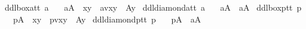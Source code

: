 \begin{isabellebody}
{}\isanewline
{}\isamarkupfalse%
\ ddlboxa{\isacharcolon}{\isacharcolon}{\isachardoublequoteopen}t{\isasymRightarrow}t{\isachardoublequoteclose}\ {\isacharparenleft}{\isachardoublequoteopen}{\isasymbox}\isactrlsub a{\isachardoublequoteclose}{\isacharparenright}\isanewline
\ \ \ {\isachardoublequoteopen}{\isasymbox}\isactrlsub aA\ {\isasymequiv}\ {\isasymlambda}x{\isachardot}{\isasymforall}y{\isachardot}\ {\isacharparenleft}{\isasymnot}\ av{\isacharparenleft}x{\isacharparenright}{\isacharparenleft}y{\isacharparenright}\ {\isasymor}\ A{\isacharparenleft}y{\isacharparenright}{\isacharparenright}{\isachardoublequoteclose}\isanewline
{}\isamarkupfalse%
\ ddldiamonda{\isacharcolon}{\isacharcolon}{\isachardoublequoteopen}t{\isasymRightarrow}t{\isachardoublequoteclose}\ {\isacharparenleft}{\isachardoublequoteopen}{\isasymdiamond}\isactrlsub a{\isachardoublequoteclose}{\isacharparenright}\isanewline
\ \ \ {\isachardoublequoteopen}{\isasymdiamond}\isactrlsub aA\ {\isasymequiv}\ \isactrlbold {\isasymnot}{\isacharparenleft}{\isasymbox}\isactrlsub a{\isacharparenleft}\isactrlbold {\isasymnot}A{\isacharparenright}{\isacharparenright}{\isachardoublequoteclose}\isanewline
{}\isamarkupfalse%
\ ddlboxp{\isacharcolon}{\isacharcolon}{\isachardoublequoteopen}t{\isasymRightarrow}t{\isachardoublequoteclose}\ {\isacharparenleft}{\isachardoublequoteopen}{\isasymbox}\isactrlsub p{\isachardoublequoteclose}{\isacharparenright}\isanewline
\ \ \ {\isachardoublequoteopen}{\isasymbox}\isactrlsub pA\ {\isasymequiv}\ {\isasymlambda}x{\isachardot}{\isasymforall}y{\isachardot}\ {\isacharparenleft}{\isasymnot}\ pv{\isacharparenleft}x{\isacharparenright}{\isacharparenleft}y{\isacharparenright}\ {\isasymor}\ A{\isacharparenleft}y{\isacharparenright}{\isacharparenright}{\isachardoublequoteclose}\isanewline
{}\isamarkupfalse%
\ ddldiamondp{\isacharcolon}{\isacharcolon}{\isachardoublequoteopen}t{\isasymRightarrow}t{\isachardoublequoteclose}\ {\isacharparenleft}{\isachardoublequoteopen}{\isasymdiamond}\isactrlsub p{\isachardoublequoteclose}{\isacharparenright}\isanewline
\ \ \ {\isachardoublequoteopen}{\isasymdiamond}\isactrlsub pA\ {\isasymequiv}\ \isactrlbold {\isasymnot}{\isacharparenleft}{\isasymbox}\isactrlsub a{\isacharparenleft}\isactrlbold {\isasymnot}A{\isacharparenright}{\isacharparenright}{\isachardoublequoteclose}\isanewline
\isanewline
%
\isanewline
{}\isamarkupfalse%

\end{isabellebody}
